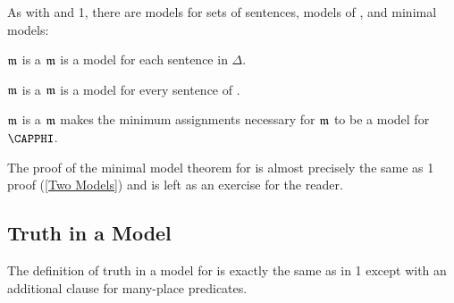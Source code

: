 As with \GSL{} and \GQL{}1, there are \GQL{} models for sets of sentences, models of \GQL{}, and \GQL{} minimal models:

\begin{majorILnc}{}
	$\mathfrak{m}$ is a  \Iff $\mathfrak{m}$ is a model for each sentence in $\Delta$.
\end{majorILnc}

\begin{majorILnc}{}
	$\mathfrak{m}$ is a  \Iff $\mathfrak{m}$ is a model for every sentence of \GQL{}.
\end{majorILnc}

\begin{majorILnc}{}
	$\mathfrak{m}$ is a  \Iff $\mathfrak{m}$ makes the minimum assignments necessary for $\mathfrak{m}$ to be a model for $\CAPPHI$.
\end{majorILnc}

\noindent{}The proof of the minimal model theorem for \GQL{} is almost precisely the same as \GQL{}1 proof (\ref{Two Models}) and is left as an exercise for the reader.

\subsection{Truth in a Model}\label{GQL Truth in an Interpretation}

The definition of truth in a model for \GQL{} is exactly the same as in \GQL{}1 except with an additional clause for many-place predicates.

